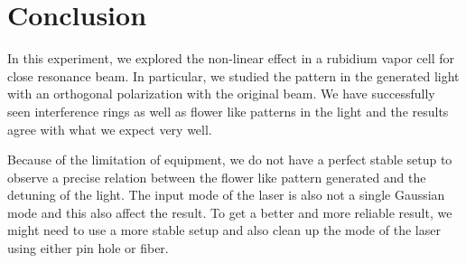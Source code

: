 \documentclass[aps,twocolumn,secnumarabic,balancelastpage,amsmath,amssymb,nofootinbib]{revtex4}
\begin{document}
\section{Conclusion}
In this experiment, we explored the non-linear effect in a rubidium vapor cell for close resonance beam. In particular, we studied the pattern in the generated light with an orthogonal polarization with the original beam. We have successfully seen interference rings as well as flower like patterns in the light and the results agree with what we expect very well.

Because of the limitation of equipment, we do not have a perfect stable setup to observe a precise relation between the flower like pattern generated and the detuning of the light. The input mode of the laser is also not a single Gaussian mode and this also affect the result. To get a better and more reliable result, we might need to use a more stable setup and also clean up the mode of the laser using either pin hole or fiber.


\end{document}
